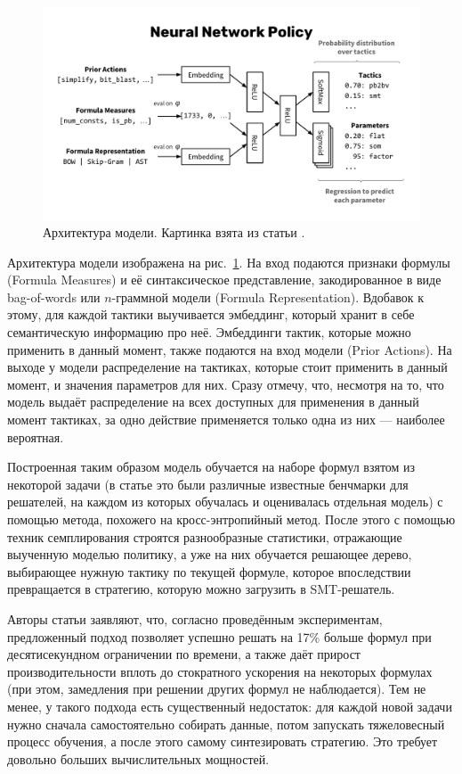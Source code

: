 \begin{figure}[ht]
\begin{center}
    \includegraphics[scale=0.65]{./assets/fastsmt-nn-policy.pdf}
    \caption{\label{fastsmt-architecture} Архитектура модели. Картинка взята из статьи \cite{fastsmt-paper}.}
\end{center}
\end{figure}

Архитектура модели изображена на рис.~\ref{fastsmt-architecture}. На вход подаются признаки формулы (Formula Measures) и её синтаксическое представление, закодированное в виде bag-of-words или $n$-граммной модели (Formula Representation). Вдобавок к этому, для каждой тактики выучивается эмбеддинг, который хранит в себе семантическую информацию про неё. Эмбеддинги тактик, которые можно применить в данный момент, также подаются на вход модели (Prior Actions). На выходе у модели распределение на тактиках, которые стоит применить в данный момент, и значения параметров для них. Сразу отмечу, что, несмотря на то, что модель выдаёт распределение на всех доступных для применения в данный момент тактиках, за одно действие применяется только одна из них --- наиболее вероятная.

Построенная таким образом модель обучается на наборе формул взятом из некоторой задачи (в статье это были различные известные бенчмарки для решателей, на каждом из которых обучалась и оценивалась отдельная модель) с помощью метода, похожего на кросс-энтропийный метод. После этого с помощью техник семплирования строятся разнообразные статистики, отражающие выученную моделью политику, а уже на них обучается решающее дерево, выбирающее нужную тактику по текущей формуле, которое впоследствии превращается в стратегию, которую можно загрузить в SMT-решатель.

Авторы статьи заявляют, что, согласно проведённым экспериментам, предложенный подход позволяет успешно решать на 17\% больше формул при десятисекундном ограничении по времени, а также даёт прирост производительности вплоть до стократного ускорения на некоторых формулах (при этом, замедления при решении других формул не наблюдается). Тем не менее, у такого подхода есть существенный недостаток: для каждой новой задачи нужно сначала самостоятельно собирать данные, потом запускать тяжеловесный процесс обучения, а после этого самому синтезировать стратегию. Это требует довольно больших вычислительных мощностей.

